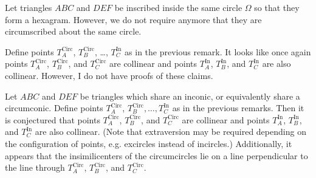 \bigskip

\begin{remark*}
Let triangles $ABC$ and $DEF$ be inscribed inside the same circle $\Omega$ so that they form a hexagram. However, we do not require anymore that they are circumscribed about the same circle.

Define points $T^\text{Circ}_A$, $T^\text{Circ}_B$, \dots, $T^\text{In}_C$ as
in the previous remark. It looks like once again points $T^\text{Circ}_A$,
$T^\text{Circ}_B$, and $T^\text{Circ}_C$ are collinear and points $T^\text{In}_A$,
$T^\text{In}_B$, and $T^\text{In}_C$ are also collinear. However, I do not
have proofs of these claims.
\end{remark*}

\begin{remark*}
  Let $ABC$ and $DEF$ be triangles which share an
  inconic, or equivalently share a circumconic.  Define points $T^\text{Circ}_A$,
  $T^\text{Circ}_B, \dots, T^\text{In}_C$ as in the previous remarks. Then
  it is conjectured that points $T^\text{Circ}_A$, $T^\text{Circ}_B$, and
  $T^\text{Circ}_C$ are collinear and points $T^\text{In}_A$, $T^\text{In}_B$,
  and $T^\text{In}_C$ are also collinear. (Note that extraversion may be
  required depending on the configuration of points, e.g. excircles instead of
  incircles.) Additionally, it appears that the insimilicenters of the
  circumcircles lie on a line perpendicular to the line through
  $T^\text{Circ}_A$, $T^\text{Circ}_B$, and $T^\text{Circ}_C$.
\end{remark*}
